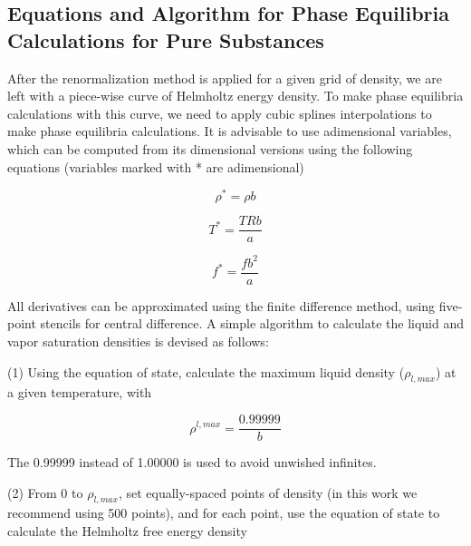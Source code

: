 \documentclass[preprint,12pt,3p]{elsarticle}
\begin{document}
\nomenclature[L]{}{}
\nomenclature[L]{}{}
\nomenclature[L]{}{}
\nomenclature[L]{}{}
\nomenclature[L]{}{}
\printnomenclature[5em]

\begin{appendices}
\renewcommand{\theequation}{\thesection.\arabic{equation}}
\setcounter{equation}{0}
\section{Equations and Algorithm for Phase Equilibria Calculations for Pure Substances}

	After the renormalization method is applied for a given grid of density, we are left with a piece-wise curve of Helmholtz energy density. To make phase equilibria calculations with this curve, we need to apply cubic splines interpolations to make phase equilibria calculations. It is advisable to use adimensional variables, which can be computed from its dimensional versions using the following equations (variables marked with * are adimensional)

\begin{equation} \label{eq:adim_dens}
	\rho^{*} = \rho b
\end{equation}	

\begin{equation} \label{eq:adim_T}
	T^{*} = \frac{TRb}{a}
\end{equation}	

\begin{equation} \label{eq:adim_f}
	f^{*} = \frac{fb^{2}}{a}
\end{equation}

	All derivatives can be approximated using the finite difference method, using five-point stencils for central difference. A simple algorithm to calculate the liquid and vapor saturation densities is devised as follows:

	(1) Using the equation of state, calculate the maximum liquid density ($\rho_{l,max}$) at a given temperature, with

\begin{equation} \label{eq:max_dens}
	\rho^{l,max} = \frac{0.99999}{b}
\end{equation}

	The 0.99999 instead of 1.00000 is used to avoid unwished infinites.

	(2) From 0 to $\rho_{l,max}$, set equally-spaced points of density (in this work we recommend using 500 points), and for each point, use the equation of state to calculate the Helmholtz free energy density


\end{appendices}
\end{document}
